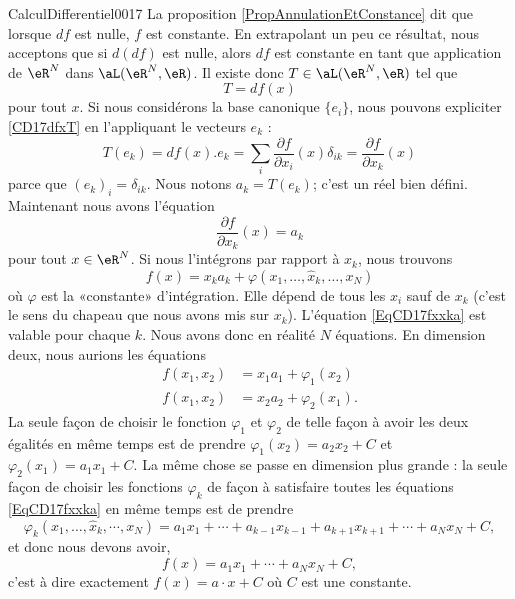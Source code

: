 \begin{corrige}{CalculDifferentiel0017}
	La proposition \ref{PropAnnulationEtConstance} dit que lorsque $df$ est nulle, $f$ est constante. En extrapolant un peu ce résultat, nous acceptons que si $d(df)$ est nulle, alors $df$ est constante en tant que application de $\eR^N$ dans $\aL(\eR^N,\eR)$. Il existe donc $T\in\aL(\eR^N,\eR)$ tel que
	\begin{equation}		\label{CD17dfxT}
		T=df(x)
	\end{equation}
	pour tout $x$. Si nous considérons la base canonique $\{ e_i \}$, nous pouvons expliciter \eqref{CD17dfxT} en l'appliquant le vecteurs $e_k$ :
	\begin{equation}
		T(e_k)=df(x).e_k=\sum_i\frac{ \partial f }{ \partial x_i }(x)\delta_{ik}=\frac{ \partial f }{ \partial x_k }(x)
	\end{equation}
	parce que $(e_k)_i=\delta_{ik}$. Nous notons $a_k=T(e_k)$; c'est un réel bien défini. Maintenant nous avons l'équation
	\begin{equation}
		\frac{ \partial f }{ \partial x_k }(x)=a_k
	\end{equation}
	pour tout $x\in\eR^N$. Si nous l'intégrons par rapport à $x_k$, nous trouvons
	\begin{equation}		\label{EqCD17fxxka}
		f(x)=x_ka_k+\varphi(x_1,\ldots,\hat x_k,\ldots,x_N)
	\end{equation}
	où $\varphi$ est la «constante» d'intégration. Elle dépend de tous les $x_i$ sauf de $x_k$ (c'est le sens du chapeau que nous avons mis sur $x_k$). L'équation \eqref{EqCD17fxxka} est valable pour chaque $k$. Nous avons donc en réalité $N$ équations. En dimension deux, nous aurions les équations
	\begin{subequations}
		\begin{align}
			f(x_1,x_2)&=x_1a_1+\varphi_1(x_2)\\
			f(x_1,x_2)&=x_2a_2+\varphi_2(x_1).
		\end{align}
	\end{subequations}
	La seule façon de choisir le fonction $\varphi_1$ et $\varphi_2$ de telle façon à avoir les deux égalités en même temps est de prendre $\varphi_1(x_2)=a_2x_2+C$ et $\varphi_2(x_1)=a_1x_1+C$. La même chose se passe en dimension plus grande : la seule façon de choisir les fonctions $\varphi_k$ de façon à satisfaire toutes les équations \eqref{EqCD17fxxka} en même temps est de prendre
	\begin{equation}
		\varphi_k(x_1,\ldots,\hat x_k,\cdots,x_N)=a_1x_1+\cdots+a_{k-1}x_{k-1}+a_{k+1}x_{k+1}+\cdots+a_Nx_N+C,
	\end{equation}
	et donc nous devons avoir,
	\begin{equation}
		f(x)=a_1x_1+\cdots+a_Nx_N+C,
	\end{equation}
	c'est à dire exactement $f(x)=a\cdot x+C$ où $C$ est une constante.

\end{corrige}
